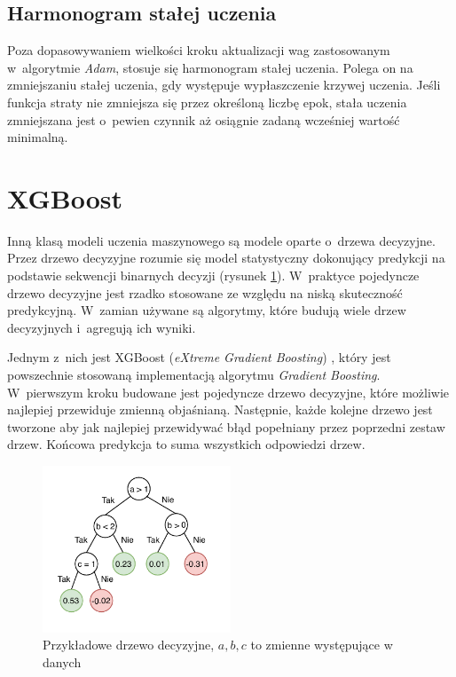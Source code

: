 \documentclass{pracalicmgr}
\begin{document}
	\subsection{Harmonogram stałej uczenia}
	Poza dopasowywaniem wielkości kroku aktualizacji wag zastosowanym w~algorytmie \textit{Adam}, stosuje się harmonogram stałej uczenia. Polega on na zmniejszaniu stałej uczenia, gdy występuje wypłaszczenie krzywej uczenia. Jeśli funkcja straty nie zmniejsza się przez określoną liczbę epok, stała uczenia zmniejszana jest o~pewien czynnik aż osiągnie zadaną wcześniej wartość minimalną.
	
	\section{XGBoost}
	Inną klasą modeli uczenia maszynowego są modele oparte o~drzewa decyzyjne. Przez drzewo decyzyjne rozumie się model statystyczny dokonujący predykcji na podstawie sekwencji binarnych decyzji (rysunek \ref{fig:tree}). W~praktyce pojedyncze drzewo decyzyjne jest rzadko stosowane ze względu na niską skuteczność predykcyjną. W~zamian używane są algorytmy, które budują wiele drzew decyzyjnych i~agregują ich wyniki.
	
	 Jednym z~nich jest XGBoost (\textit{eXtreme Gradient Boosting}) \cite{xgboost}, który jest powszechnie stosowaną implementacją algorytmu \textit{Gradient Boosting}. W~pierwszym kroku budowane jest pojedyncze drzewo decyzyjne, które możliwie najlepiej przewiduje zmienną objaśnianą. Następnie, każde kolejne drzewo jest tworzone aby jak najlepiej przewidywać błąd popełniany przez poprzedni zestaw drzew. Końcowa predykcja to suma wszystkich odpowiedzi drzew.
	
	\begin{figure}[h]
	\centering
	\includegraphics[width=0.5\textwidth]{tree.pdf}
	\caption{Przykładowe drzewo decyzyjne, $a, b, c$ to zmienne występujące w danych}
	\label{fig:tree}
	\end{figure}
	
\end{document}
